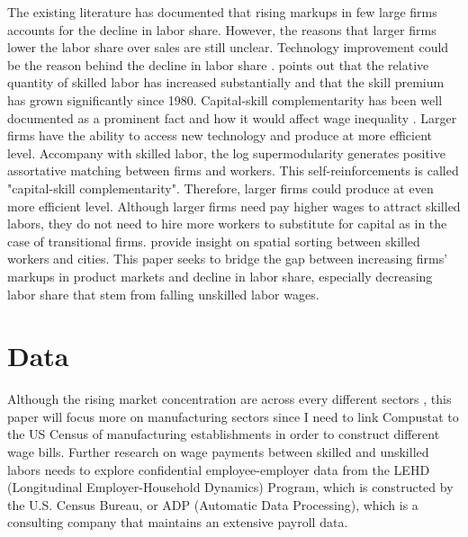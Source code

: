 \documentclass[12pt]{article}
\begin{document}
The existing literature has documented that rising markups in few large firms accounts for the decline in labor share. However, the reasons that larger firms lower the labor share over sales are still unclear. Technology improvement could be the reason behind the decline in labor share \citep{autor2017dp11810}. \citet{krusell2000capital} points out that the relative quantity of skilled labor has increased substantially and that the skill premium has grown significantly since 1980. Capital-skill complementarity has been well documented as a prominent fact and how it would affect wage inequality \citep{polgreen2008capital,lindquist2004capital,duffy2004capital}. Larger firms have the ability to access new technology and produce at more efficient level. Accompany with skilled labor, the log supermodularity generates positive assortative matching between firms and workers. This self-reinforcements is called "capital-skill complementarity". Therefore, larger firms could produce at even more efficient level. Although larger firms need pay higher wages to attract skilled labors, they do not need to hire more workers to substitute for capital as in the case of transitional firms. \citet{eeckhout2014spatial} provide insight on spatial sorting between skilled workers and cities. This paper seeks to bridge the gap between increasing firms' markups in product markets and decline in labor share, especially decreasing labor share that stem from falling unskilled labor wages.   

\section{Data} 
\label{sec:literature}
Although the rising market concentration are across every different sectors \citep{autor2017fall}, this paper will focus more on manufacturing sectors since I need to link Compustat to the US Census of manufacturing establishments in order to construct different wage bills. Further research on wage payments between skilled and unskilled labors needs to explore confidential employee-employer data from the LEHD (Longitudinal Employer-Household Dynamics) Program, which is constructed by the U.S. Census Bureau, or ADP (Automatic Data Processing), which is a consulting company that maintains an extensive payroll data.
\end{document}
